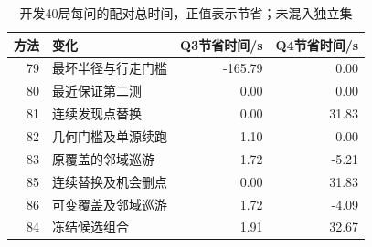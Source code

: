 ﻿\begin{table}[!htbp]\centering\small\caption{开发40局每问的配对总时间，正值表示节省；未混入独立集}\label{tab:dev}\begin{tabular}{rlrr}\toprule 方法&变化&Q3节省时间/s&Q4节省时间/s\\\midrule
79&最坏半径与行走门槛&-165.79&0.00\\
80&最近保证第二测&0.00&0.00\\
81&连续发现点替换&0.00&31.83\\
82&几何门槛及单源续跑&1.10&0.00\\
83&原覆盖的邻域巡游&1.72&-5.21\\
85&连续替换及机会删点&0.00&31.83\\
86&可变覆盖及邻域巡游&1.72&-4.09\\
84&冻结候选组合&1.91&32.67\\
\bottomrule\end{tabular}\end{table}